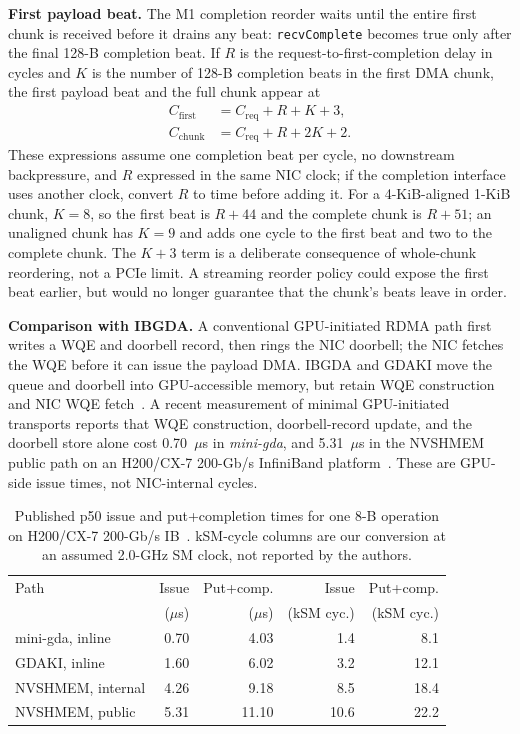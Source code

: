 \textbf{First payload beat.}
The M1 completion reorder waits until the entire first chunk is received before
it drains any beat: \texttt{recvComplete} becomes true only after the final
128-B completion beat.  If $R$ is the request-to-first-completion delay in
cycles and $K$ is the number of 128-B completion beats in the first DMA chunk,
the first payload beat and the full chunk appear at
\begin{align}
  C_{\mathrm{first}} &= C_{\mathrm{req}} + R + K + 3, \\
  C_{\mathrm{chunk}} &= C_{\mathrm{req}} + R + 2K + 2.
\end{align}
These expressions assume one completion beat per cycle, no downstream
backpressure, and $R$ expressed in the same NIC clock; if the completion
interface uses another clock, convert $R$ to time before adding it.
For a 4-KiB-aligned 1-KiB chunk, $K=8$, so the first beat is $R+44$ and the
complete chunk is $R+51$; an unaligned chunk has $K=9$ and adds one cycle to
the first beat and two to the complete chunk.  The $K+3$ term is a deliberate
consequence of whole-chunk reordering, not a PCIe limit.  A streaming reorder
policy could expose the first beat earlier, but would no longer guarantee that
the chunk's beats leave in order.

\textbf{Comparison with IBGDA.}
A conventional GPU-initiated RDMA path first writes a WQE and doorbell record,
then rings the NIC doorbell; the NIC fetches the WQE before it can issue the
payload DMA.  IBGDA and GDAKI move the queue and doorbell into GPU-accessible
memory, but retain WQE construction and NIC WQE fetch~\cite{nvshmem-ibgda,baydamirli2026gpu}.
A recent measurement of minimal GPU-initiated transports reports that
WQE construction, doorbell-record update, and the doorbell store alone cost
0.70~$\mu$s in \emph{mini-gda}, and 5.31~$\mu$s in the NVSHMEM public path on
an H200/CX-7 200-Gb/s InfiniBand platform~\cite{baydamirli2026gpu}.  These are
GPU-side issue times, not NIC-internal cycles.

\begin{table}[H]
  \centering
  \caption{Published p50 issue and put+completion times for one 8-B operation
  on H200/CX-7 200-Gb/s IB~\cite{baydamirli2026gpu}.  kSM-cycle columns are our
  conversion at an assumed 2.0-GHz SM clock, not reported by the authors.}
  \label{tab:eval:ibgda}
  \scriptsize
  \begin{tabular}{@{}lrrrr@{}}
    \toprule
    Path & Issue & Put+comp. & Issue & Put+comp. \\
    & ($\mu$s) & ($\mu$s) & (kSM cyc.) & (kSM cyc.) \\
    \midrule
    mini-gda, inline & 0.70 & 4.03 & 1.4 & 8.1 \\
    GDAKI, inline & 1.60 & 6.02 & 3.2 & 12.1 \\
    NVSHMEM, internal & 4.26 & 9.18 & 8.5 & 18.4 \\
    NVSHMEM, public & 5.31 & 11.10 & 10.6 & 22.2 \\
    \bottomrule
  \end{tabular}
\end{table}

